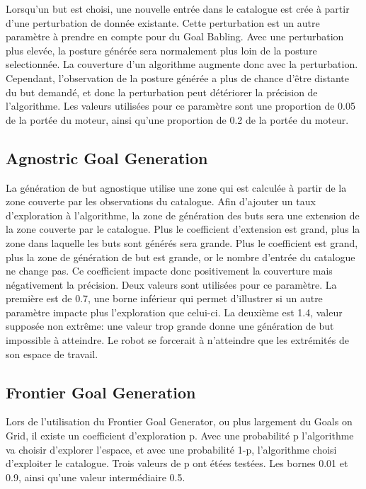 \documentclass[11pt,french]{report}
\begin{document}
Lorsqu'un but est choisi, une nouvelle entrée dans le catalogue est crée à partir d'une perturbation de donnée existante.
Cette perturbation est un autre paramètre à prendre en compte pour du Goal Babling.
Avec une perturbation plus elevée, la posture générée sera normalement plus loin de la posture selectionnée.
La couverture d'un algorithme augmente donc avec la perturbation.
Cependant, l'observation de la posture générée a plus de chance d'être distante du but demandé, et donc la perturbation peut détériorer la précision de l'algorithme.
Les valeurs utilisées pour ce paramètre sont une proportion de 0.05 de la portée du moteur, ainsi qu'une proportion de 0.2 de la portée du moteur.

\subsection{Agnostric Goal Generation}

La génération de but agnostique utilise une zone qui est calculée à partir de la zone couverte par les observations du catalogue.
Afin d'ajouter un taux d'exploration à l'algorithme, la zone de génération des buts sera une extension de la zone couverte par le catalogue.
Plus le coefficient d'extension est grand, plus la zone dans laquelle les buts sont générés sera grande.
Plus le coefficient est grand, plus la zone de génération de but est grande, or le nombre d'entrée du catalogue ne change pas.
Ce coefficient impacte donc positivement la couverture mais négativement la précision.
Deux valeurs sont utilisées pour ce paramètre.
La première est de 0.7, une borne inférieur qui permet d'illustrer si un autre paramètre impacte plus l'exploration que celui-ci.
La deuxième est 1.4, valeur supposée non extrême: une valeur trop grande donne une génération de but impossible à atteindre.
Le robot se forcerait à n'atteindre que les extrémités de son espace de travail.

\subsection{Frontier Goal Generation}

Lors de l'utilisation du Frontier Goal Generator, ou plus largement du Goals on Grid, il existe un coefficient d'exploration p.
Avec une probabilité p l'algorithme va choisir d'explorer l'espace, et avec une probabilité 1-p, l'algorithme choisi d'exploiter le catalogue.
Trois valeurs de p ont étées testées.
Les bornes 0.01 et 0.9, ainsi qu'une valeur intermédiaire 0.5.
\end{document}

